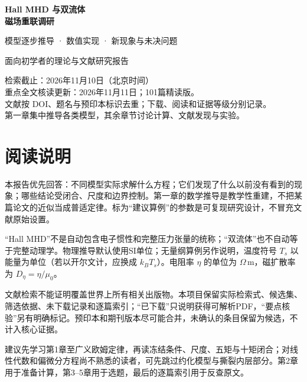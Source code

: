 \documentclass[UTF8,a4paper,11pt,openany,fontset=fandol]{ctexbook}
\begin{document}
\frontmatter
\begin{titlepage}
\vspace*{20mm}
{\sffamily\Huge\bfseries\color{ink}Hall MHD 与双流体\\[8pt]磁场重联调研\par}
\vspace{12mm}
{\sffamily\Large 模型逐步推导 · 数值实现 · 新现象与未决问题\par}
\vspace{14mm}
{\large 面向初学者的理论与文献研究报告\par}
\vfill
检索截止：2026年11月10日（北京时间）\\[5pt]
重点全文核读更新：2026年11月11日；101篇精读版。\\[5pt]
文献按 DOI、题名与预印本标识去重；下载、阅读和证据等级分别记录。\\[5pt]
第一章集中推导各类模型，其余章节讨论计算、文献发现与实验。\\[8pt]

\end{titlepage}
\chapter*{阅读说明}
本报告优先回答：不同模型实际求解什么方程；它们发现了什么以前没有看到的现象；哪些结论受闭合、尺度和边界控制。第一章的数学推导是教学性重建，不把某篇论文的近似当成普适定律。标为“建议算例”的参数是可复现研究设计，不冒充文献原始设置。

“Hall MHD”不是自动包含电子惯性和完整压力张量的统称；“双流体”也不自动等于完整动理学。物理推导默认使用SI单位；无量纲算例另作说明，温度符号 $T_s$ 以能量为单位（若以开尔文计，应换成 $k_BT_s$）。电阻率 $\eta$ 的单位为 $\Omega\,\mathrm m$，磁扩散率为 $D_\eta=\eta/\mu_0$。

文献检索不能证明覆盖世界上所有相关出版物。本项目保留实际检索式、候选集、筛选依据、未下载记录和逐篇索引；“已下载”只说明获得可解析PDF，“要点核验”另有明确标记。预印本和期刊版本尽可能合并，未确认的条目保留为候选，不计入核心证据。

建议先学习第1章至广义欧姆定律，再读冻结条件、尺度、五矩与十矩闭合；对线性代数和偏微分方程尚不熟悉的读者，可先跳过约化模型与撕裂内层部分。第2章用于准备计算，第3--5章用于选题，最后的逐篇索引用于反查原文。
\tableofcontents
\mainmatter









\backmatter


\end{document}
